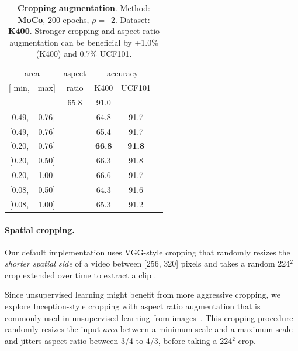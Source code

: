\documentclass[final]{cvpr}
\newcommand{\tablestyle}[2]{\setlength{\tabcolsep}{#1}\renewcommand{\arraystretch}{#2}\centering\footnotesize}
\begin{document}
	\begin{table}[h!] 
		\vspace{-10pt}
		\centering
		\tablestyle{3pt}{1.05} 
		\tablestyle{6.4pt}{1.0}	
		\begin{tabular}{cccccc}
			\multicolumn{2}{c}{area } &  aspect  & \multicolumn{2}{c}{accuracy}  \\
			$[$ min, & max$]$  &  ratio &  K400 & UCF101  \\
			\shline
			\multicolumn{2}{c}{default \cite{Simonyan15, He16, Feichtenhofer19}}  &  & 65.8 &  91.0 \\ \hline
			$[$0.49, & 0.76$]$  & & 64.8 & 91.7 \\ 
			$[$0.49, & 0.76$]$  & \checkmark& 65.4 & 91.7 \\ 
			$[$0.20, & 0.76$]$  & \checkmark& \textbf{66.8} & \textbf{91.8} \\ 
			$[$0.20, & 0.50$]$  & \checkmark& 66.3 & 91.8 \\ 
			$[$0.20, & 1.00$]$  &\checkmark& 66.6 & 91.7 \\ 
			$[$0.08, & 0.50$]$  & \checkmark& 64.3 & 91.6 \\ 
			$[$0.08, & 1.00$]$  &\checkmark& 65.3 & 91.2 \\ 
		\end{tabular}
		\vspace{.3em}
		\caption{\textbf{Cropping augmentation}. Method: \textbf{MoCo}, 200 epochs, $\rho=$~2. Dataset: \textbf{K400}. Stronger cropping and aspect ratio augmentation can be beneficial by +1.0\% (K400) and 0.7\% UCF101. } \vspace{-10pt}
		\label{tab:crop_aug}
	\end{table}
	\paragraph{Spatial cropping.}
	Our default implementation uses VGG-style \cite{Simonyan15, He16} cropping that randomly resizes the \textit{shorter spatial side} of a video between [256, 320] pixels and takes a random 224$^\text{2}$ crop extended over time to extract a clip \cite{Feichtenhofer19}. %
	
	Since unsupervised learning might benefit from more aggressive cropping, we explore Inception-style \cite{Szegedy15} cropping with aspect ratio augmentation that is commonly used in unsupervised learning from images~\cite{He20, Chen20, Grill2020, Caron20}. This cropping procedure randomly resizes the input \textit{area} between a minimum scale and a maximum scale and jitters aspect ratio between 3/4 to 4/3, before taking a 224$^\text{2}$ crop.
	
\end{document}
